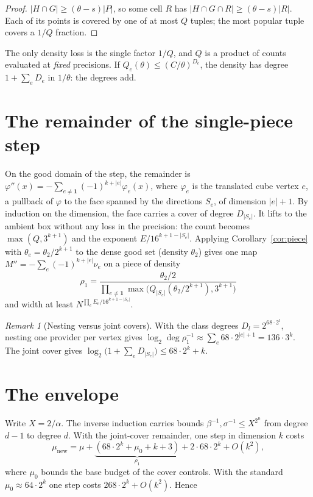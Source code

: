 \documentclass[11pt]{article}
\theoremstyle{definition}
\theoremstyle{remark}
\newtheorem{remark}[theorem]{Remark}
\newcommand{\Qb}{Q}
\newcommand{\Eb}{E}
\begin{document}
\begin{proof}
$|H\cap G|\ge(\theta-s)|P|$, so some cell $R$ has
$|H\cap G\cap R|\ge(\theta-s)|R|$. Each of its points is covered by one of at
most $Q$ tuples; the most popular tuple covers a $1/Q$ fraction.
\end{proof}

The only density loss is the single factor $1/Q$, and $Q$ is a product of
counts evaluated at \emph{fixed} precisions. If $\Qb_e(\theta)\le(C/\theta)^{D_e}$,
the density has degree $1+\sum_e D_e$ in $1/\theta$: the degrees add.

\section{The remainder of the single-piece step}

On the good domain of the step, the remainder is
$\varphi''(x)=-\sum_{e\ne\mathbf 1}(-1)^{k+|e|}\varphi_e(x)$, where $\varphi_e$ is
the translated cube vertex $e$, a pullback of $\varphi$ to the face spanned by
the directions $S_e$, of dimension $|e|+1$. By induction on the dimension, the
face carries a cover of degree $D_{|S_e|}$. It lifts to the ambient box without
any loss in the precision: the count becomes $\max(\Qb,3^{k+1})$ and the
exponent $\Eb/16^{k+1-|S_e|}$. Applying Corollary~\ref{cor:piece} with
$\theta_e=\theta_2/2^{k+1}$ to the dense good set (density $\theta_2$) gives one
map $M''=-\sum_e(-1)^{k+|e|}\nu_e$ on a piece of density
\[
  \rho_1=\frac{\theta_2/2}{\prod_{e\ne\mathbf 1}\max\bigl(\Qb_{|S_e|}(\theta_2/2^{k+1}),3^{k+1}\bigr)}
\]
and width at least $N^{\prod_e\Eb_e/16^{k+1-|S_e|}}$.

\begin{remark}[Nesting versus joint covers]
With the class degrees $D_l=2^{68\cdot2^l}$, nesting one provider per vertex
gives $\log_2\deg\rho_1^{-1}\approx\sum_{e}68\cdot2^{|e|+1}=136\cdot3^k$. The
joint cover gives $\log_2\bigl(1+\sum_eD_{|S_e|}\bigr)\le68\cdot2^k+k$.
\end{remark}

\section{The envelope}

Write $X=2/\alpha$. The inverse induction carries bounds
$\beta^{-1},\sigma^{-1}\le X^{2^{\mu}}$ from degree $d-1$ to degree $d$. With the
joint-cover remainder, one step in dimension $k$ costs
\[
  \mu_{\mathrm{new}}=\mu+\underbrace{(68\cdot2^k+\mu_0+k+3)}_{\rho_1}
  +2\cdot68\cdot2^k+O(k^2),
\]
where $\mu_0$ bounds the base budget of the cover controls. With the standard
$\mu_0\approx64\cdot2^k$ one step costs $268\cdot2^k+O(k^2)$. Hence
\end{document}
